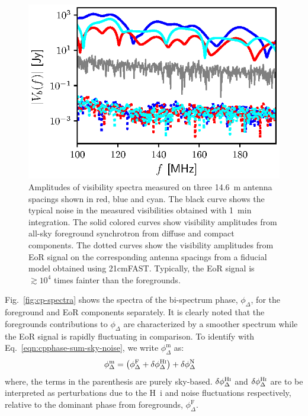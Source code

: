 \documentclass[
reprint,
superscriptaddress,
amsmath,
amssymb,
aps,
prd
]{revtex4-1}
\begin{document}
\begin{figure}[htb]
\includegraphics[width=\linewidth]{visamp_spectra_asm_eor_noise}
\caption{Amplitudes of visibility spectra measured on three 14.6~m antenna spacings shown in red, blue and cyan. The black curve shows the typical noise in the measured visibilities obtained with 1~min integration. The solid colored curves show visibility amplitudes from all-sky foreground synchrotron from diffuse and compact components. The dotted curves show the visibility amplitudes from EoR signal on the corresponding antenna spacings from a fiducial model obtained using 21cmFAST. Typically, the EoR signal is $\gtrsim 10^4$ times fainter than the foregrounds. \label{fig:vis-spectra}}
\end{figure}

Fig.~\ref{fig:cp-spectra} shows the spectra of the bi-spectrum phase, $\phi_\Delta$, for the foreground and EoR components separately. It is clearly noted that the foregrounds contributions to $\phi_\Delta$ are characterized by a smoother spectrum while the EoR signal is rapidly fluctuating in comparison. To identify with Eq.~\ref{eqn:cpphase-sum-sky-noise}, we write $\phi_\Delta^\textrm{m}$ as:
\begin{align}\label{eqn:cp-components}
  \phi_\Delta^\textrm{m} &= \left(\phi_\Delta^\textrm{F} + \delta\phi_\Delta^\textrm{H{\sc i}}\right) + \delta\phi_\Delta^\textrm{N}
\end{align}
where, the terms in the parenthesis are purely sky-based. $\delta\phi_\Delta^\textrm{H{\sc i}}$ and $\delta\phi_\Delta^\textrm{H{\sc i}}$ are to be interpreted as perturbations due to the H~{\sc i} and noise fluctuations respectively, relative to the dominant phase from foregrounds, $\phi_\Delta^\textrm{F}$.
\end{document}
